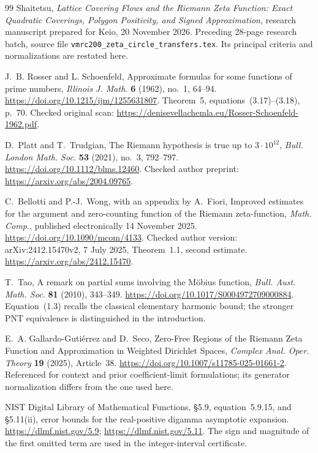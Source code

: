 \documentclass[11pt,a4paper]{article}
\theoremstyle{definition}\newtheorem{definition}[theorem]{Definition}
\theoremstyle{remark}\newtheorem{remark}[theorem]{Remark}
\numberwithin{equation}{section}
\begin{document}
\begin{thebibliography}{99}
Shaitetsu,
\emph{Lattice Covering Flows and the Riemann Zeta Function:
Exact Quadratic Coverings, Polygon Positivity, and Signed Approximation},
research manuscript prepared for Keio, 20 November 2026.
Preceding 28-page research batch, source file
\texttt{vmrc200\_zeta\_circle\_transfers.tex}.
Its principal criteria and normalizations are restated here.

J.~B. Rosser and L. Schoenfeld,
Approximate formulas for some functions of prime numbers,
\emph{Illinois J. Math.} \textbf{6} (1962), no.~1, 64--94.
\url{https://doi.org/10.1215/ijm/1255631807}.
Theorem~5, equations~(3.17)--(3.18), p.~70.
Checked original scan:
\url{https://denisevellachemla.eu/Rosser-Schoenfeld-1962.pdf}.

D.~Platt and T.~Trudgian,
The Riemann hypothesis is true up to $3\cdot10^{12}$,
\emph{Bull. London Math. Soc.} \textbf{53} (2021), no.~3, 792--797.
\url{https://doi.org/10.1112/blms.12460}.
Checked author preprint: \url{https://arxiv.org/abs/2004.09765}.

C.~Bellotti and P.-J.~Wong, with an appendix by A.~Fiori,
Improved estimates for the argument and zero-counting function
of the Riemann zeta-function,
\emph{Math. Comp.}, published electronically 14 November 2025.
\url{https://doi.org/10.1090/mcom/4133}.
Checked author version: arXiv:2412.15470v2, 7 July 2025,
Theorem~1.1, second estimate.
\url{https://arxiv.org/abs/2412.15470}.

T.~Tao,
A remark on partial sums involving the M\"obius function,
\emph{Bull. Aust. Math. Soc.} \textbf{81} (2010), 343--349.
\url{https://doi.org/10.1017/S0004972709000884}.
Equation~(1.3) recalls the classical elementary harmonic bound;
the stronger PNT equivalence is distinguished in the introduction.

E.~A. Gallardo-Guti\'errez and D.~Seco,
Zero-Free Regions of the Riemann Zeta Function and Approximation
in Weighted Dirichlet Spaces,
\emph{Complex Anal. Oper. Theory} \textbf{19} (2025), Article~38.
\url{https://doi.org/10.1007/s11785-025-01661-2}.
Referenced for context and prior coefficient-limit formulations;
its generator normalization differs from the one used here.

NIST Digital Library of Mathematical Functions,
\S5.9, equation~5.9.15, and \S5.11(ii), error bounds for the
real-positive digamma asymptotic expansion.
\url{https://dlmf.nist.gov/5.9};
\url{https://dlmf.nist.gov/5.11}.
The sign and magnitude of the first omitted term are used in
the integer-interval certificate.


\end{thebibliography}
\end{document}
